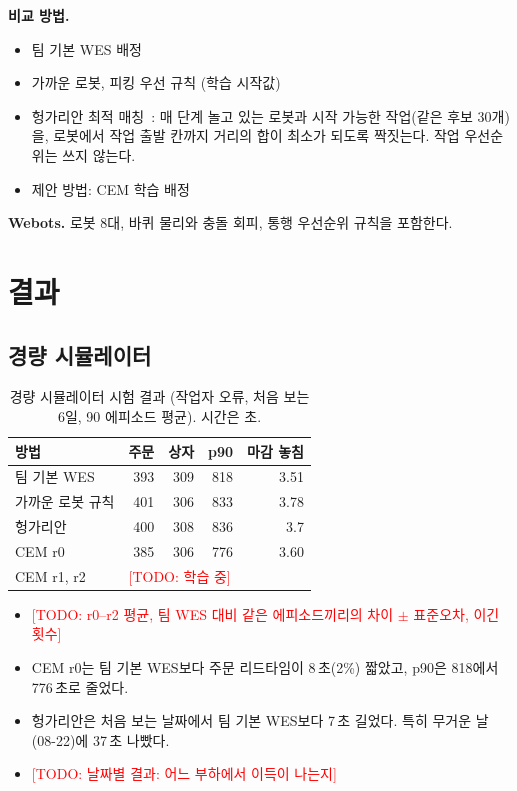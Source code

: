 \documentclass[conference]{IEEEtran}
\newcommand{\todo}[1]{\textcolor{red}{[TODO: #1]}}
\begin{document}
\textbf{비교 방법.}
\begin{itemize}
  \item 팀 기본 WES 배정
  \item 가까운 로봇, 피킹 우선 규칙 (학습 시작값)
  \item 헝가리안 최적 매칭~\cite{kuhn1955}: 매 단계 놀고 있는 로봇과 시작 가능한 작업(같은 후보 30개)을, 로봇에서 작업 출발 칸까지 거리의 합이 최소가 되도록 짝짓는다. 작업 우선순위는 쓰지 않는다. %
  \item 제안 방법: CEM 학습 배정
\end{itemize}

\textbf{Webots.}
로봇 8대, 바퀴 물리와 충돌 회피, 통행 우선순위 규칙을 포함한다.

\section{결과}

\subsection{경량 시뮬레이터}

\begin{table}[t]
\centering
\caption{경량 시뮬레이터 시험 결과 (작업자 오류, 처음 보는 6일, 90 에피소드 평균). 시간은 초.} %
\label{tab:lite}
\small
\begin{tabular}{lrrrr}
\toprule
방법 & 주문 & 상자 & p90 & 마감 놓침 \\
\midrule
팀 기본 WES & 393 & 309 & 818 & 3.51 \\
가까운 로봇 규칙 & 401 & 306 & 833 & 3.78 \\
헝가리안 & 400 & 308 & 836 & 3.7 \\
CEM r0 & 385 & 306 & 776 & 3.60 \\
CEM r1, r2 & \multicolumn{4}{l}{\todo{학습 중}} \\
\bottomrule
\end{tabular}
\end{table}

\begin{itemize}
  \item \todo{r0--r2 평균, 팀 WES 대비 같은 에피소드끼리의 차이 $\pm$ 표준오차, 이긴 횟수}
  \item CEM r0는 팀 기본 WES보다 주문 리드타임이 8\,초(2\%) 짧았고, p90은 818에서 776\,초로 줄었다.
  \item 헝가리안은 처음 보는 날짜에서 팀 기본 WES보다 7\,초 길었다. 특히 무거운 날(08-22)에 37\,초 나빴다.
  \item \todo{날짜별 결과: 어느 부하에서 이득이 나는지}
\end{itemize}
\end{document}

